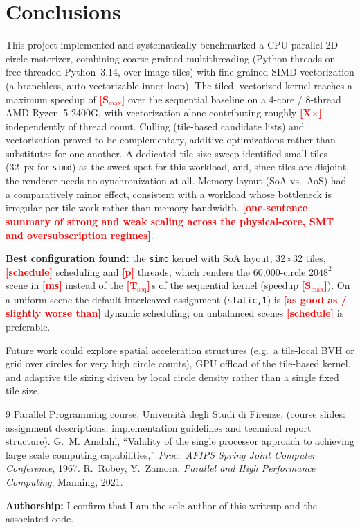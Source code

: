 \documentclass[10pt,twocolumn,letterpaper]{article}
\newcommand{\tbd}[1]{\textcolor{red}{\textbf{[#1]}}}
\begin{document}
\section{Conclusions}

This project implemented and systematically benchmarked a CPU-parallel 2D
circle rasterizer, combining coarse-grained multithreading (Python threads
on free-threaded Python~3.14, over image tiles) with fine-grained SIMD vectorization
(a branchless, auto-vectorizable inner loop). The tiled, vectorized kernel
reaches a maximum speedup of \tbd{S$_{\max}$} over the sequential
baseline on a 4-core / 8-thread AMD Ryzen~5 2400G, with vectorization alone contributing
roughly \tbd{X$\times$} independently of thread count. Culling
(tile-based candidate lists) and vectorization proved to be complementary,
additive optimizations rather than substitutes for one another. A dedicated
tile-size sweep identified small tiles (32~px for \texttt{simd}) as the sweet spot for this workload,
and, since tiles are disjoint, the renderer needs no synchronization at all.
Memory layout (SoA vs.\ AoS) had a comparatively minor effect,
consistent with a workload whose bottleneck is irregular per-tile work rather
than memory bandwidth. \tbd{one-sentence summary of strong and weak scaling
across the physical-core, SMT and oversubscription regimes}.

\textbf{Best configuration found:} the \texttt{simd} kernel with SoA
layout, 32$\times$32 tiles, \tbd{schedule} scheduling and \tbd{p}
threads, which renders the 60{,}000-circle $2048^2$ scene in \tbd{ms}
instead of the \tbd{T$_{\text{seq}}$}\,s of the sequential kernel
(speedup \tbd{S$_{\max}$}). On a uniform scene the default interleaved
assignment (\texttt{static,1}) is \tbd{as good as / slightly worse than}
dynamic scheduling; on unbalanced scenes \tbd{schedule} is preferable.

Future work could explore spatial acceleration structures (e.g.\ a
tile-local BVH or grid over circles for very high circle counts), GPU
offload of the tile-based kernel, and adaptive tile sizing driven by local
circle density rather than a single fixed tile size.

\begin{thebibliography}{9}
\small
{} Parallel Programming course, Universit\`a degli Studi di
  Firenze, (course slides: assignment
  descriptions, implementation guidelines and technical report structure).
 G.~M. Amdahl, ``Validity of the single processor approach
  to achieving large scale computing capabilities,''
  \emph{Proc.\ AFIPS Spring Joint Computer Conference}, 1967.
 R.~Robey, Y.~Zamora, \emph{Parallel and High Performance
  Computing}, Manning, 2021.
\end{thebibliography}

\vspace{1ex}
\noindent\textbf{Authorship:} I confirm that I am the sole author of this
writeup and the associated code.
\end{document}
